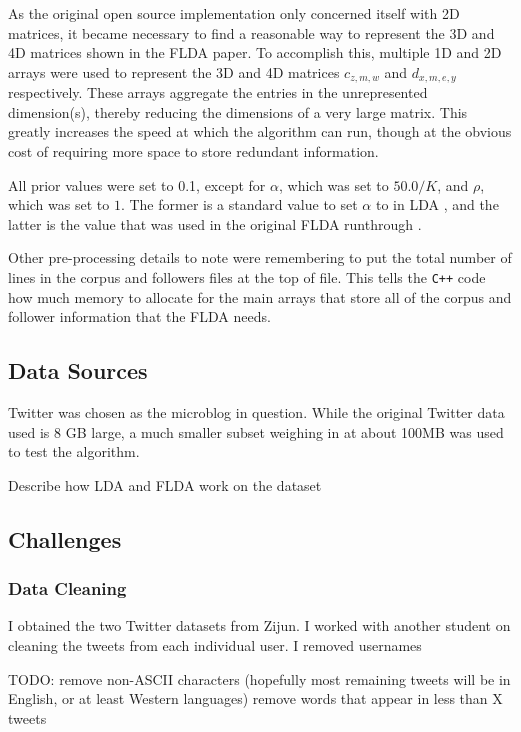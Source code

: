 \documentclass[a4paper]{article}
\begin{document}
As the original open source implementation only concerned itself with 2D matrices, it became necessary to find a reasonable way to represent the 3D and 4D matrices shown in the FLDA paper. To accomplish this, multiple 1D and 2D arrays were used to represent the 3D and 4D matrices $c_{z, m, w}$ and $d_{x, m, e, y}$ respectively. These arrays aggregate the entries in the unrepresented dimension(s), thereby reducing the dimensions of a very large matrix. This greatly increases the speed at which the algorithm can run, though at the obvious cost of requiring more space to store redundant information.

All prior values were set to 0.1, except for $\alpha$, which was set to $50.0 / K$, and $\rho$, which was set to $1$. The former is a standard value to set $\alpha$ to in LDA \cite{lda}, and the latter is the value that was used in the original FLDA runthrough \cite{flda}. 

Other pre-processing details to note were remembering to put the total number of lines in the corpus and followers files at the top of file. This tells the \verb!C++! code how much memory to allocate for the main arrays that store all of the corpus and follower information that the FLDA needs.

\subsection{Data Sources}\label{sec:data}
Twitter was chosen as the microblog in question. While the original Twitter data used is 8 GB large, a much smaller subset weighing in at about 100MB was used to test the algorithm.

Describe how LDA and FLDA work on the dataset

\subsection{Challenges}\label{sec:challenges}

\subsubsection{Data Cleaning}
I obtained the two Twitter datasets from Zijun. 
I worked with another student on cleaning the tweets from each individual user. I removed usernames 

TODO: remove non-ASCII characters (hopefully most remaining tweets will be in English, or at least Western languages)
remove words that appear in less than X tweets
\end{document}
